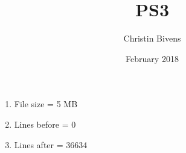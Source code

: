 \documentclass{article}
\title{PS3}
\author{Christin Bivens }
\date{February 2018}
\begin{document}
\begin{enumerate}
    \item File size = 5 MB
    \item Lines before = 0
    \item Lines after = 36634
\end{enumerate}
\end{document}
